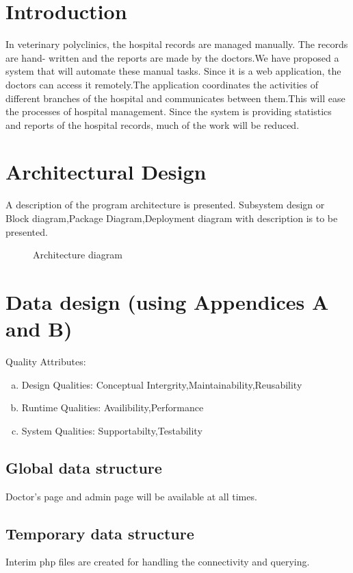 \documentclass[oneside,a4paper,12pt]{book}
\begin{document}
 \section{Introduction}  
In veterinary polyclinics, the hospital records are managed manually. The records are hand-
written and the reports are made by the doctors.We have proposed a system that will automate
these manual tasks. Since it is a web application, the doctors can access it remotely.The
application coordinates the activities of different branches of the hospital and communicates
between them.This will ease the processes of hospital management. Since the system is
providing statistics and reports of the hospital records, much of the work will be reduced.
 
\section{Architectural Design}  
	A description of the program architecture is presented. Subsystem design or Block diagram,Package Diagram,Deployment diagram with description is to be presented.

 
  \begin{center}
	\begin{figure}[!htbp]
		\centering
	  \caption{Architecture diagram}
	  \label{fig:arch-dig}
	\end{figure}
\end{center} 


\section{Data design (using Appendices A and B)}   
Quality Attributes:
\begin{enumerate}[(a)]
\item Design Qualities: Conceptual Intergrity,Maintainability,Reusability
\item Runtime Qualities: Availibility,Performance
\item System Qualities: Supportabilty,Testability
\end{enumerate}



\subsection{Global data structure}
Doctor’s page and admin page will be available at all times.
\subsection{Temporary data structure}
Interim php files are created for handling the connectivity and querying.
\end{document}
